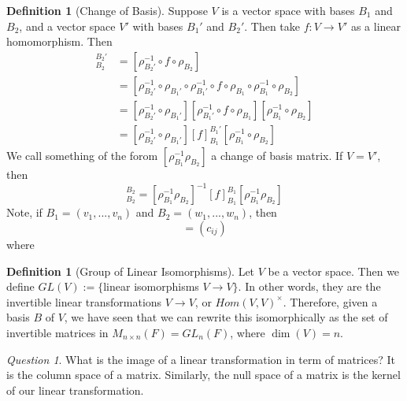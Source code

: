 \documentclass[12pt]{article}
\theoremstyle{definition}
\newtheorem{defn}[thm]{Definition}
\theoremstyle{remark}
\newtheorem*{qst}{Question}
\numberwithin{equation}{section}
\begin{document}
\vspace{15pt}

\begin{defn}[Change of Basis]
        Suppose $V$ is a vector space with bases $B_1$ and $B_2$, and a vector space $V'$ with bases $B_1'$ and $B_2'$. Then take $f:V\rightarrow V'$ as a linear homomorphism. Then \begin{align*}
                [f]_{B_2}^{B_2'} &= [\rho_{B_2'}^{-1}\circ f \circ \rho_{B_2}] \\
                &= [\rho_{B_2'}^{-1}\circ\rho_{B_1'}\circ\rho_{B_1'}^{-1}\circ f \circ\rho_{B_1}\circ\rho_{B_1}^{-1}\circ \rho_{B_2}] \\
                &= [\rho_{B_2'}^{-1}\circ\rho_{B_1'}][\rho_{B_1'}^{-1}\circ f \circ\rho_{B_1}][\rho_{B_1}^{-1}\circ \rho_{B_2}] \\
                &= [\rho_{B_2'}^{-1}\circ\rho_{B_1'}][f]_{B_1}^{B_1'}[\rho_{B_1}^{-1}\circ \rho_{B_2}] 
        \end{align*}
        We call something of the forom $[\rho_{B_1}^{-1}\rho_{B_2}]$ a change of basis matrix. If $V = V'$, then \begin{equation}
                [f]_{B_2}^{B_2} = [\rho_{B_1}^{-1}\rho_{B_2}]^{-1}[f]_{B_1}^{B_1}[\rho_{B_1}^{-1}\rho_{B_2}]
        \end{equation}
        Note, if $B_1 = (v_1,...,v_n)$ and $B_2 = (w_1,...,w_n)$, then \begin{equation}
                [\rho_{B_1}^{-1}\rho_{B_2}] = (c_{ij})
        \end{equation}
        where 
\end{defn}

\vspace{15pt}

\begin{defn}[Group of Linear Isomorphisms]
        Let $V$ be a vector space. Then we define $GL(V) :=\{$linear isomorphisms $V\rightarrow V\}$. In other words, they are the invertible linear transformations $V\rightarrow V$, or $Hom(V,V)^{\times}$. Therefore, given a basis $B$ of $V$, we have seen that we can rewrite this isomorphically as the set of invertible matrices in $M_{n\times n}(F) = GL_n(F)$, where $\dim(V) = n$.
\end{defn}


\vspace{15pt}

\begin{qst}
        What is the image of a linear transformation in term of matrices? It is the column space of a matrix. Similarly, the null space of a matrix is the kernel of our linear transformation.
\end{qst}
\end{document}
